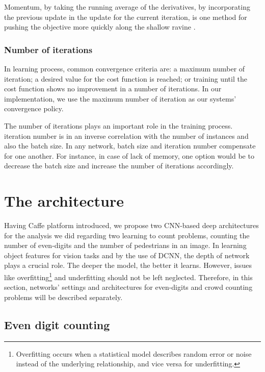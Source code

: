 Momentum, by taking the running average of the derivatives, by incorporating the previous update in the update for the current iteration, is one method for pushing the objective more quickly along the shallow ravine \cite{sgd}. 

\subsubsection{Number of iterations}

In learning process, common convergence criteria are: a maximum number of iteration; a desired value for the cost function is reached; or training until the cost function shows no improvement in a number of iterations. In our implementation, we use the maximum number of iteration as our systems' convergence policy. 
 
The number of iterations plays an important role in the training process. iteration number is in an inverse correlation with the number of instances and also the batch size. In any network, batch size and iteration number compensate for one another. For instance, in case of lack of memory, one option would be to decrease the batch size and increase the number of iterations accordingly.


\section{The architecture}
\label{imparch}

Having Caffe platform introduced, we propose two CNN-based deep architectures for the analysis we did regarding two learning to count problems, counting the number of even-digits and the number of pedestrians in an image.  
In learning object features for vision tasks and by the use of DCNN, the depth of network plays a crucial role. The deeper the model, the better it learns. However, issues like overfitting\footnote{Overfitting occurs when a statistical model describes random error or noise instead of the underlying relationship, and vice versa for underfitting. } and underfitting should not be left neglected.   
Therefore, in this section, networks' settings and architectures for even-digits and crowd counting problems will be described separately. 

\subsection{Even digit counting}
\label{subsubsec:digitarch}

